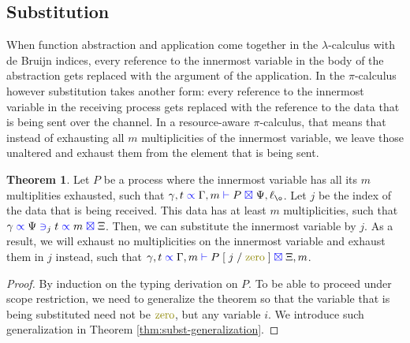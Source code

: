 \documentclass[a4paper,UKenglish,cleveref, autoref, thm-restate,authorcolumns]{lipics-v2019}
\theoremstyle{definition}
\newtheorem{nitheorem}[theorem]{Theorem}
\newcommand{\lambdacalc}{$\lambda$-calculus}
\newcommand{\picalc}{$\pi$-calculus}
\newcommand{\type}[1]{\textcolor{blue}{\operatorname{#1}}}
\newcommand{\constr}[1]{\textcolor{olive}{\operatorname{#1}}}
\newcommand{\subst}[3]{#1 \; [ \; #2 \; / \;#3 \;]}
\newcommand{\types}[4]{#1 \; \type{\propto} \; #2 \; \type{\vdash} \; #3 \; \type{\boxtimes} \; #4}
\newcommand{\contains}[6]{#1 \; \type{\propto} \; #2 \; \type{\ni}_{#3} \; #4 \; \type{\propto} \; #5 \; \type{\boxtimes} \; #6}
\begin{document}
\subsection{Substitution}

When function abstraction and application come together in the \lambdacalc{} with de Bruijn indices, every reference to the innermost variable in the body of the abstraction gets replaced with the argument of the application.
In the \picalc{} however substitution takes another form: every reference to the innermost variable in the receiving process gets replaced with the reference to the data that is being sent over the channel.
In a resource-aware \picalc{}, that means that instead of exhausting all $m$ multiplicities of the innermost variable, we leave those unaltered and exhaust them from the element that is being sent.

\begin{nitheorem}
  \label{thm:substitution}
  Let $P$ be a process where the innermost variable has all its $m$ multiplities exhausted, such that $\types{\gamma , t}{\Gamma , m}{P}{\Psi , \ell_{\o}}$.
  Let $j$ be the index of the data that is being received.
  This data has at least $m$ multiplicities, such that $\contains{\gamma}{\Psi}{j}{t}{m}{\Xi}$.
  Then, we can substitute the innermost variable by $j$.
  As a result, we will exhaust no multiplicities on the innermost variable and exhaust them in $j$ instead, such that $\types{\gamma , t}{\Gamma , m}{\subst{P}{j}{\constr{zero}}}{\Xi , m}$.
\end{nitheorem}

\begin{proof}
  By induction on the typing derivation on $P$.
  To be able to proceed under scope restriction, we need to generalize the theorem so that the variable that is being substituted need not be $\constr{zero}$, but any variable $i$.
  We introduce such generalization in Theorem \ref{thm:subst-generalization}.
\end{proof}
\end{document}
